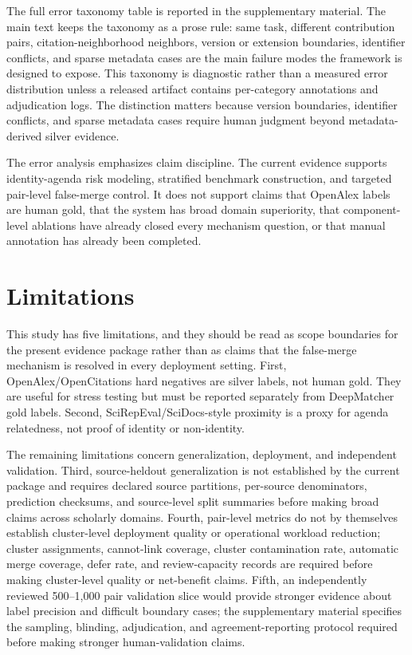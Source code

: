\documentclass[11pt]{article}
\begin{document}
The full error taxonomy table is reported in the supplementary material. The main text keeps the taxonomy as a prose rule: same task, different contribution pairs, citation-neighborhood neighbors, version or extension boundaries, identifier conflicts, and sparse metadata cases are the main failure modes the framework is designed to expose. This taxonomy is diagnostic rather than a measured error distribution unless a released artifact contains per-category annotations and adjudication logs. The distinction matters because version boundaries, identifier conflicts, and sparse metadata cases require human judgment beyond metadata-derived silver evidence.

The error analysis emphasizes claim discipline. The current evidence supports identity-agenda risk modeling, stratified benchmark construction, and targeted pair-level false-merge control. It does not support claims that OpenAlex labels are human gold, that the system has broad domain superiority, that component-level ablations have already closed every mechanism question, or that manual annotation has already been completed.

\section{Limitations}

This study has five limitations, and they should be read as scope boundaries for the present evidence package rather than as claims that the false-merge mechanism is resolved in every deployment setting. First, OpenAlex/OpenCitations hard negatives are silver labels, not human gold. They are useful for stress testing but must be reported separately from DeepMatcher gold labels. Second, SciRepEval/SciDocs-style proximity is a proxy for agenda relatedness, not proof of identity or non-identity.

The remaining limitations concern generalization, deployment, and independent validation. Third, source-heldout generalization is not established by the current package and requires declared source partitions, per-source denominators, prediction checksums, and source-level split summaries before making broad claims across scholarly domains. Fourth, pair-level metrics do not by themselves establish cluster-level deployment quality or operational workload reduction; cluster assignments, cannot-link coverage, cluster contamination rate, automatic merge coverage, defer rate, and review-capacity records are required before making cluster-level quality or net-benefit claims. Fifth, an independently reviewed 500--1,000 pair validation slice would provide stronger evidence about label precision and difficult boundary cases; the supplementary material specifies the sampling, blinding, adjudication, and agreement-reporting protocol required before making stronger human-validation claims.
\end{document}
